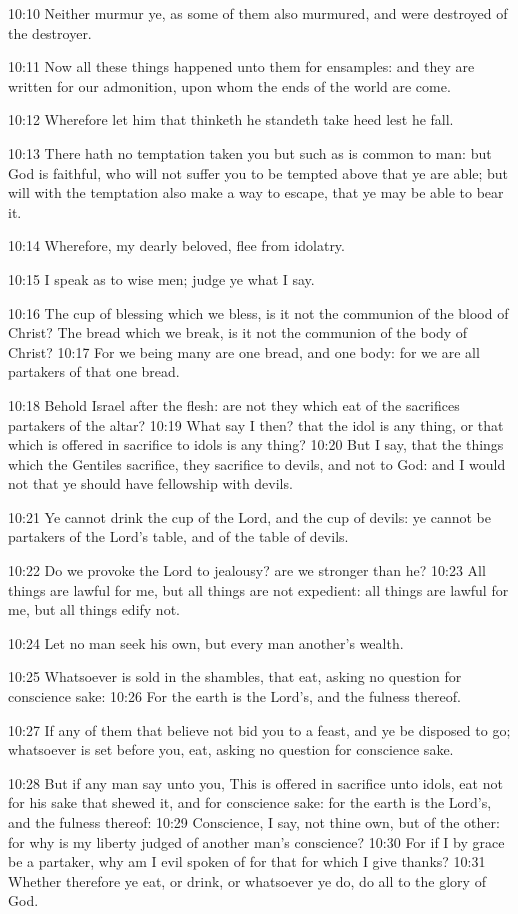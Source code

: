 10:10 Neither murmur ye, as some of them also murmured, and were destroyed of the destroyer.

10:11 Now all these things happened unto them for ensamples: and they are written for our admonition, upon whom the ends of the world are come.

10:12 Wherefore let him that thinketh he standeth take heed lest he fall.

10:13 There hath no temptation taken you but such as is common to man: but God is faithful, who will not suffer you to be tempted above that ye are able; but will with the temptation also make a way to escape, that ye may be able to bear it.

10:14 Wherefore, my dearly beloved, flee from idolatry.

10:15 I speak as to wise men; judge ye what I say.

10:16 The cup of blessing which we bless, is it not the communion of the blood of Christ? The bread which we break, is it not the communion of the body of Christ?  10:17 For we being many are one bread, and one body: for we are all partakers of that one bread.

10:18 Behold Israel after the flesh: are not they which eat of the sacrifices partakers of the altar?  10:19 What say I then? that the idol is any thing, or that which is offered in sacrifice to idols is any thing?  10:20 But I say, that the things which the Gentiles sacrifice, they sacrifice to devils, and not to God: and I would not that ye should have fellowship with devils.

10:21 Ye cannot drink the cup of the Lord, and the cup of devils: ye cannot be partakers of the Lord's table, and of the table of devils.

10:22 Do we provoke the Lord to jealousy? are we stronger than he?  10:23 All things are lawful for me, but all things are not expedient: all things are lawful for me, but all things edify not.

10:24 Let no man seek his own, but every man another's wealth.

10:25 Whatsoever is sold in the shambles, that eat, asking no question for conscience sake: 10:26 For the earth is the Lord's, and the fulness thereof.

10:27 If any of them that believe not bid you to a feast, and ye be disposed to go; whatsoever is set before you, eat, asking no question for conscience sake.

10:28 But if any man say unto you, This is offered in sacrifice unto idols, eat not for his sake that shewed it, and for conscience sake: for the earth is the Lord's, and the fulness thereof: 10:29 Conscience, I say, not thine own, but of the other: for why is my liberty judged of another man's conscience?  10:30 For if I by grace be a partaker, why am I evil spoken of for that for which I give thanks?  10:31 Whether therefore ye eat, or drink, or whatsoever ye do, do all to the glory of God.

